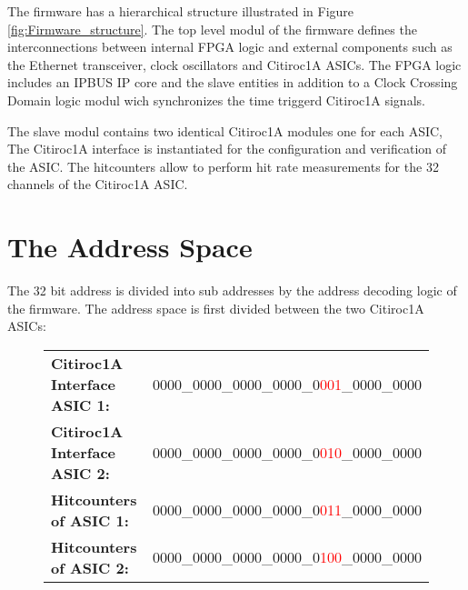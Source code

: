The firmware has a hierarchical structure illustrated in Figure \ref{fig:Firmware_structure}. 
\newline
The top level modul of the firmware defines the interconnections between internal FPGA logic and external components such as the Ethernet transceiver, clock oscillators and Citiroc1A ASICs.
\newline
The FPGA logic includes an IPBUS IP core and the slave entities in addition to a Clock Crossing Domain logic modul wich synchronizes the time triggerd Citiroc1A signals. 
\newline

The slave modul contains two identical Citiroc1A modules one for each ASIC, The Citiroc1A interface is instantiated for the configuration and verification of the ASIC.
The hitcounters allow to perform hit rate measurements for the 32 channels of the Citiroc1A ASIC. 
\section{The Address Space}
The 32 bit address is divided into sub addresses by the address decoding logic of the firmware.
\newline
The address space is first divided between the two Citiroc1A ASICs:
\begin{figure}[H]
    \centering
\begin{tabular}{p{7cm} l}
    \textbf{Citiroc1A Interface ASIC 1:} & 0000\_0000\_0000\_0000\_0\textcolor{red}{001}\_0000\_0000 \\
    \textbf{Citiroc1A Interface ASIC 2:} & 0000\_0000\_0000\_0000\_0\textcolor{red}{010}\_0000\_0000 \\
    \textbf{Hitcounters of ASIC 1:} & 0000\_0000\_0000\_0000\_0\textcolor{red}{011}\_0000\_0000 \\
    \textbf{Hitcounters of ASIC 2: } & 0000\_0000\_0000\_0000\_0\textcolor{red}{100}\_0000\_0000\\
\end{tabular}
\end{figure}

